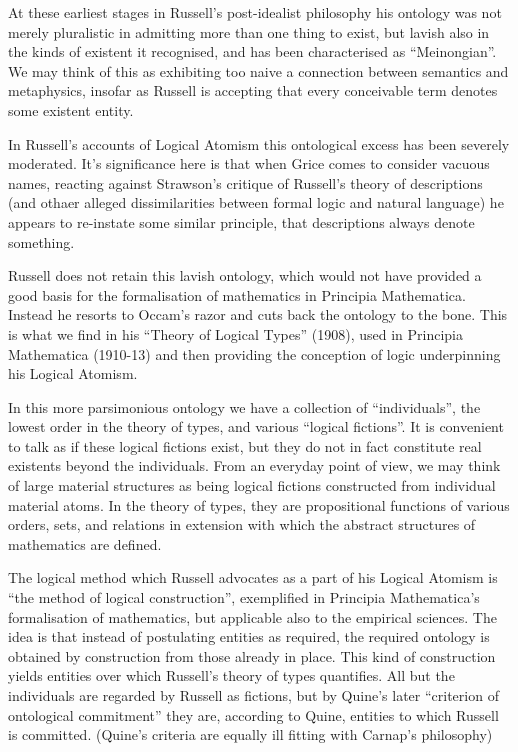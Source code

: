 \documentclass[10pt,titlepage]{article}
\begin{document}
At these earliest stages in Russell's post-idealist philosophy his ontology was not merely pluralistic in admitting more than one thing to exist, but lavish also in the kinds of existent it recognised, and has been characterised as ``Meinongian''.
We may think of this as exhibiting too naive a connection between semantics and metaphysics, insofar as Russell is accepting that every conceivable term denotes some existent entity.

In Russell's accounts of Logical Atomism this ontological excess has been severely moderated.
It's significance here is that when Grice comes to consider vacuous names, reacting against Strawson's critique of Russell's theory of descriptions (and othaer alleged dissimilarities between formal logic and natural language) he appears to re-instate some similar principle, that descriptions always denote something.

Russell does not retain this lavish ontology, which would not have provided a good basis for the formalisation of mathematics in Principia Mathematica.
Instead he resorts to Occam's razor and cuts back the ontology to the bone.
This is what we find in his ``Theory of Logical Types'' (1908), used in Principia Mathematica (1910-13) and then providing the conception of logic underpinning his Logical Atomism.

In this more parsimonious ontology we have a collection of ``individuals'', the lowest order in the theory of types, and various ``logical fictions''.
It is convenient to talk as if these logical fictions exist, but they do not in fact constitute real existents beyond the individuals.
From an everyday point of view, we may think of large material structures as being logical fictions constructed from individual material atoms.
In the theory of types, they are propositional functions of various orders, sets, and relations in extension with which the abstract structures of mathematics are defined.

The logical method which Russell advocates as a part of his Logical Atomism is ``the method of logical construction'', exemplified in Principia Mathematica's formalisation of mathematics, but applicable also to the empirical sciences.
The idea is that instead of postulating entities as required, the required ontology is obtained by construction from those already in place.
This kind of construction yields entities over which Russell's theory of types quantifies.
All but the individuals are regarded by Russell as fictions, but by Quine's later ``criterion of ontological commitment'' they are, according to Quine, entities to which Russell is committed.
(Quine's criteria are equally ill fitting with Carnap's philosophy) 
\end{document}
